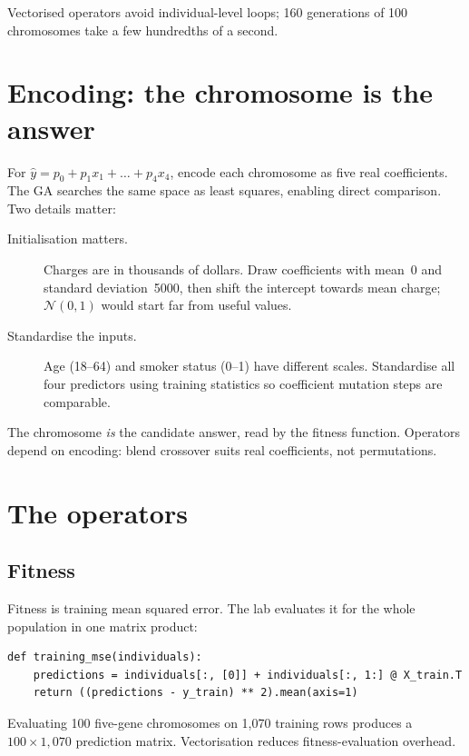 Vectorised operators avoid individual-level loops; 160 generations of 100 chromosomes take a few hundredths of a second.

\section{Encoding: the chromosome is the answer}

For $\hat y=p_0+p_1x_1+\dots+p_4x_4$, encode each chromosome as five real coefficients. The GA searches the same space as least squares, enabling direct comparison. Two details matter:

\begin{description}
  \item[Initialisation matters.] Charges are in thousands of dollars. Draw coefficients with mean~0 and standard deviation~5000, then shift the intercept towards mean charge; $\mathcal N(0,1)$ would start far from useful values.
  \item[Standardise the inputs.] Age (18--64) and smoker status (0--1) have different scales. Standardise all four predictors using training statistics so coefficient mutation steps are comparable.
\end{description}

\begin{intuition}
The chromosome \emph{is} the candidate answer, read by the fitness function. Operators depend on encoding: blend crossover suits real coefficients, not permutations.
\end{intuition}

\section{The operators}

\subsection{Fitness}

Fitness is training mean squared error. The lab evaluates it for the whole population in one matrix product:

\begin{lstlisting}[style=utppython]
def training_mse(individuals):
    predictions = individuals[:, [0]] + individuals[:, 1:] @ X_train.T
    return ((predictions - y_train) ** 2).mean(axis=1)
\end{lstlisting}

Evaluating 100 five-gene chromosomes on 1,070 training rows produces a $100\times1{,}070$ prediction matrix. Vectorisation reduces fitness-evaluation overhead.

